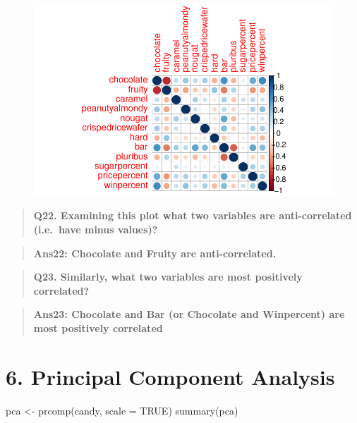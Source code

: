 \documentclass[
  letterpaper,
  DIV=11,
  numbers=noendperiod]{scrartcl}
\newenvironment{Shaded}{\begin{snugshade}}{\end{snugshade}}
\newcommand{\AttributeTok}[1]{\textcolor[rgb]{0.40,0.45,0.13}{#1}}
\newcommand{\ConstantTok}[1]{\textcolor[rgb]{0.56,0.35,0.01}{#1}}
\newcommand{\FunctionTok}[1]{\textcolor[rgb]{0.28,0.35,0.67}{#1}}
\newcommand{\NormalTok}[1]{\textcolor[rgb]{0.00,0.23,0.31}{#1}}
\newcommand{\OtherTok}[1]{\textcolor[rgb]{0.00,0.23,0.31}{#1}}
\begin{document}
\begin{figure}[H]

{\centering \includegraphics{class10_files/figure-pdf/unnamed-chunk-27-1.pdf}

}

\end{figure}

\begin{quote}
\textbf{Q22. Examining this plot what two variables are anti-correlated
(i.e.~have minus values)?}
\end{quote}

\begin{quote}
\textbf{Ans22: Chocolate and Fruity are anti-correlated.}
\end{quote}

\begin{quote}
\textbf{Q23. Similarly, what two variables are most positively
correlated?}
\end{quote}

\begin{quote}
\textbf{Ans23: Chocolate and Bar (or Chocolate and Winpercent) are most
positively correlated}
\end{quote}

\hypertarget{principal-component-analysis}{%
\section{6. Principal Component
Analysis}\label{principal-component-analysis}}

\begin{Shaded}
\begin{Highlighting}[]
\NormalTok{pca }\OtherTok{\textless{}{-}} \FunctionTok{prcomp}\NormalTok{(candy, }\AttributeTok{scale =} \ConstantTok{TRUE}\NormalTok{)}
\FunctionTok{summary}\NormalTok{(pca)}
\end{Highlighting}
\end{Shaded}
\end{document}
